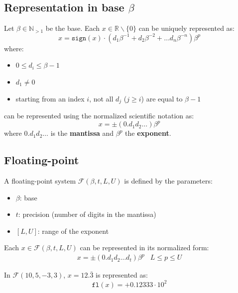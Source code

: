 \subsection{Representation in base \texorpdfstring{$\beta$}{B}}

Let $\beta \in \mathbb{N}_{> 1}$ be the base.
Each $x \in \mathbb{R} \smallsetminus \{0\}$ can be uniquely represented as:
\begin{equation} \label{eq:finnum_b_representation}
    x = \texttt{sign}(x) \cdot (d_1\beta^{-1} + d_2\beta^{-2} + \dots d_n\beta^{-n})\beta^p
\end{equation}
where:
\begin{itemize}
    \item $0 \leq d_i \leq \beta-1$
    \item $d_1 \neq 0$
    \item starting from an index $i$, not all $d_j$ ($j \geq i$) are equal to $\beta-1$
\end{itemize}
%
 can be represented using the normalized scientific notation as: 
\begin{equation}
    x = \pm (0.d_1d_2\dots) \beta^p
\end{equation}
where $0.d_1d_2\dots$ is the \textbf{mantissa} and $\beta^p$ the \textbf{exponent}. 



\subsection{Floating-point}
A floating-point system $\mathcal{F}(\beta, t, L, U)$ is defined by the parameters: 
\begin{itemize}
    \item $\beta$: base
    \item $t$: precision (number of digits in the mantissa)
    \item $[L, U]$: range of the exponent
\end{itemize}
%
Each $x \in \mathcal{F}(\beta, t, L, U)$ can be represented in its normalized form:
\begin{eqnarray}
    x = \pm (0.d_1d_2 \dots d_t) \beta^p & L \leq p \leq U
\end{eqnarray}
\begin{example}
    In $\mathcal{F}(10, 5, -3, 3)$, $x=12.\bar{3}$ is represented as:
    \begin{equation*}
        \texttt{fl}(x) = + 0.12333 \cdot 10^2
    \end{equation*}
\end{example}



